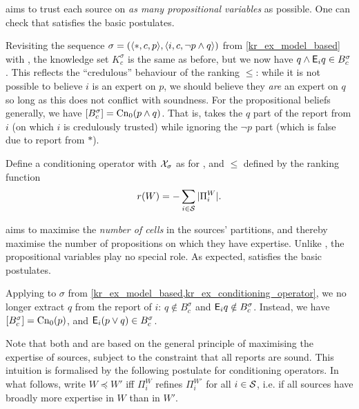 \varbasedcond{} aims to trust each source on \emph{as many propositional
variables} as possible. One can check that \varbasedcond{} satisfies the
basic postulates. 

\begin{example}
    \label{kr_ex_conditioning_operator}
    Revisiting the sequence
    $
        \sigma
        = (\langle {\ast, c, p} \rangle, \langle {i, c, \neg p \land q} \rangle)
    $
    from \cref{kr_ex_model_based} with \varbasedcond{}, the knowledge set
    $K^\sigma_c$ is the same as before, but we now have $q \land \mathsf{E}_i{q} \in
    B^\sigma_c$. This reflects the ``credulous'' behaviour of the ranking
    $\le$: while it is not possible to believe $i$ is an expert on $p$, we
    should believe they \emph{are} an expert on $q$ so long as this does not
    conflict with soundness. For the propositional beliefs generally, we have
    $\left[{B^\sigma_c}\right] = \operatorname{Cn}_0(p \land q)$. That is, \varbasedcond{} takes
    the $q$ part of the report from $i$ (on which $i$ is credulously trusted)
    while ignoring the $\neg p$ part (which is false due to report from
    $\ast$).

\end{example}

\begin{definition}
    Define a conditioning operator \partbasedcond{} with $\mathcal{X}_\sigma$ as
    for \varbasedcond{}, and $\le$ defined by the ranking function
    \[
        r(W) = -\sum_{i \in \mathcal{S}}{|\Pi^W_i|}.
    \]
\end{definition}

\partbasedcond{} aims to maximise the \emph{number of cells} in the sources'
partitions, and thereby maximise the number of propositions on which they have
expertise. Unlike \varbasedcond{}, the propositional variables play no special
role. As expected, \partbasedcond{} satisfies the basic postulates.

\begin{example}
    Applying \partbasedcond{} to $\sigma$ from
    \cref{kr_ex_model_based,kr_ex_conditioning_operator}, we no longer extract $q$
    from the report of $i$: $q \notin B^\sigma_c$ and $\mathsf{E}_i{q} \notin
    B^\sigma_c$. Instead, we have $\left[{B^\sigma_c}\right] = \operatorname{Cn}_0(p)$, and
    $\mathsf{E}_i(p \lor q) \in B^\sigma_c$.
\end{example}

Note that both \varbasedcond{} and \partbasedcond{} are based on the general
principle of maximising the expertise of sources, subject to the constraint
that all reports are sound. This intuition is formalised by the following
postulate for conditioning operators. In what follows, write $W \preceq W'$ iff
$\Pi^W_i$ refines $\Pi^{W'}_i$ for all $i \in \mathcal{S}$, i.e. if all sources have
broadly more expertise in $W$ than in $W'$.\footnotemark{}


